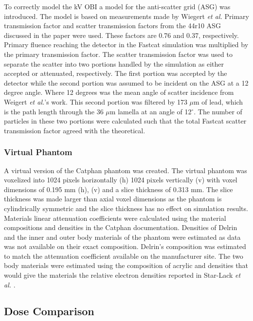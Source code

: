To correctly model the kV OBI a model for the anti-scatter grid (ASG) was introduced. The model is based on measurements made by Wiegert \textit{et al.} \cite{Wiegert2004PerformanceCT} Primary transmission factor and scatter transmission factors from the 44r10 ASG discussed in the paper were used. These factors are 0.76 and 0.37, respectively. Primary fluence reaching the detector in the Fastcat simulation was multiplied by the primary transmission factor. The scatter transmission factor was used to separate the scatter into two portions handled by the simulation as either accepted or attenuated, respectively. The first portion was accepted by the detector while the second portion was assumed to be incident on the ASG at a 12 degree angle. Where 12 degrees was the mean angle of scatter incidence from Weigert \textit{et al.}’s work. This second portion was filtered by 173 $\mu$m of lead, which is the path length through the 36 $\mu$m lamella at an angle of 12$^\circ$. The number of particles in these two portions were calculated such that the total Fastcat scatter transmission factor agreed with the theoretical.

\subsubsection{Virtual Phantom}

 A virtual version of the Catphan phantom was created. The virtual phantom was voxelized into 1024 pixels horizontally (h) 1024 pixels vertically (v) with voxel dimensions of 0.195 mm (h), (v) and a slice thickness of 0.313 mm. The slice thickness was made larger than axial voxel dimensions as the phantom is cylindrically symmetric and the slice thickness has no effect on simulation results. Materials linear attenuation coefficients were calculated using the material compositions and densities in the Catphan documentation. Densities of Delrin and the inner and outer body materials of the phantom were estimated as data was not available on their exact composition. Delrin’s composition was estimated to match the attenuation coefficient available on the manufacturer site. The two body materials were estimated using the composition of acrylic and densities that would give the materials the relative electron densities reported in Star-Lack \textit{et al.} \cite{Star-Lack2015AImaging}.

\subsection{Dose Comparison}


